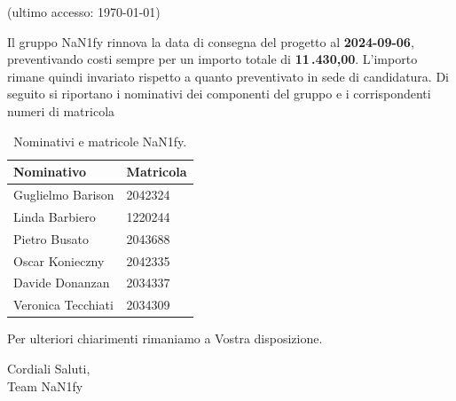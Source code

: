 \documentclass[8pt]{article}
\begin{document}
\begin{center}
	\textbf{\href{https://github.com/NaN1fy/SyncCity}{\color{myblue}{https://github.com/NaN1fy/SyncCity}}
    } (ultimo accesso: \today)
\end{center}
Il gruppo NaN1fy rinnova la data di consegna del progetto al \textbf{2024-09-06}, preventivando
costi sempre per un importo totale di \textbf{11\,.430,00\;\texteuro}. L’importo rimane quindi invariato
rispetto a quanto preventivato in sede di candidatura.
\clearpage
Di seguito si riportano i nominativi dei componenti del gruppo e i corrispondenti numeri di matricola\\
\begin{table}[h!]
	\centering
	\begin{tabular}{p{3cm} p{3cm}}
		\toprule
		\textbf{Nominativo} & \textbf{Matricola} \\
		\midrule
		Guglielmo Barison & 2042324 \\
		Linda Barbiero &  1220244 \\
		Pietro Busato & 2043688 \\
		Oscar Konieczny & 2042335 \\
		Davide Donanzan & 2034337 \\
		Veronica Tecchiati & 2034309 \\
		\bottomrule
	\end{tabular}
	\caption{Nominativi e matricole NaN1fy.}
	\label{table:Nominativi e matricole NaN1fy}
\end{table}
Per ulteriori chiarimenti rimaniamo a Vostra disposizione.
\vspace{1em}
\begin{flushleft}
	Cordiali Saluti,\\
	Team NaN1fy
\end{flushleft}
\clearpage
\newpage
\justifying
\end{document}
